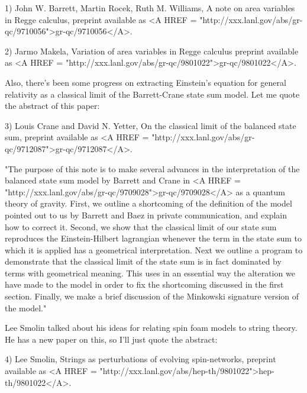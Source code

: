 1) John W. Barrett, Martin Rocek, Ruth M. Williams, A note on area 
variables in Regge calculus, preprint available as <A HREF = "http://xxx.lanl.gov/abs/gr-qc/9710056">gr-qc/9710056</A>.

2) Jarmo Makela, Variation of area variables in Regge calculus
preprint available as <A HREF = "http://xxx.lanl.gov/abs/gr-qc/9801022">gr-qc/9801022</A>.  

Also, there's been some progress on extracting Einstein's equation for
general relativity as a classical limit of the Barrett-Crane state
sum model.  Let me quote the abstract of this paper:

3) Louis Crane and David N. Yetter, On the classical limit of the
balanced state sum, preprint available as <A HREF = "http://xxx.lanl.gov/abs/gr-qc/9712087">gr-qc/9712087</A>.

"The purpose of this note is to make several advances in the
interpretation of the balanced state sum model by Barrett and Crane in
<A HREF = "http://xxx.lanl.gov/abs/gr-qc/9709028">gr-qc/9709028</A> as a quantum theory of gravity. First, we outline a
shortcoming of the definition of the model pointed out to us by Barrett
and Baez in private communication, and explain how to correct
it. Second, we show that the classical limit of our state sum reproduces
the Einstein-Hilbert lagrangian whenever the term in the state sum to
which it is applied has a geometrical interpretation. Next we outline a
program to demonstrate that the classical limit of the state sum is in
fact dominated by terms with geometrical meaning. This uses in an
essential way the alteration we have made to the model in order to fix
the shortcoming discussed in the first section. Finally, we make a brief
discussion of the Minkowski signature version of the model."

Lee Smolin talked about his ideas for relating spin foam models 
to string theory.  He has a new paper on this, so I'll just
quote the abstract:

4) Lee Smolin, Strings as perturbations of evolving spin-networks,
preprint available as <A HREF = "http://xxx.lanl.gov/abs/hep-th/9801022">hep-th/9801022</A>.

